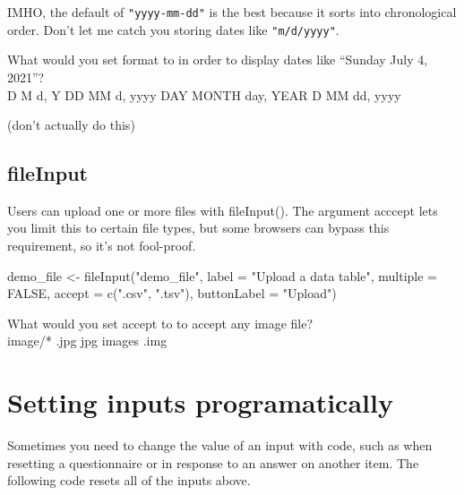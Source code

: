 \documentclass[
]{book}
\newenvironment{Shaded}{\begin{snugshade}}{\end{snugshade}}
\newcommand{\AttributeTok}[1]{\textcolor[rgb]{0.77,0.63,0.00}{#1}}
\newcommand{\ConstantTok}[1]{\textcolor[rgb]{0.00,0.00,0.00}{#1}}
\newcommand{\FunctionTok}[1]{\textcolor[rgb]{0.00,0.00,0.00}{#1}}
\newcommand{\NormalTok}[1]{#1}
\newcommand{\OtherTok}[1]{\textcolor[rgb]{0.56,0.35,0.01}{#1}}
\newcommand{\StringTok}[1]{\textcolor[rgb]{0.31,0.60,0.02}{#1}}
\begin{document}
IMHO, the default of \texttt{"yyyy-mm-dd"} is the best because it sorts into chronological order. Don't let me catch you storing dates like \texttt{"m/d/yyyy"}.

What would you set format to in order to display dates like ``Sunday July 4, 2021''?\\
D M d, Y DD MM d, yyyy DAY MONTH day, YEAR D MM dd, yyyy

(don't actually do this)

\hypertarget{fileinput}{%
\subsection{fileInput}\label{fileinput}}

Users can upload one or more files with fileInput(). The argument acccept lets you limit this to certain file types, but some browsers can bypass this requirement, so it's not fool-proof.

\begin{Shaded}
\begin{Highlighting}[]
\NormalTok{demo\_file }\OtherTok{\textless{}{-}} \FunctionTok{fileInput}\NormalTok{(}\StringTok{"demo\_file"}\NormalTok{,}
                       \AttributeTok{label =} \StringTok{"Upload a data table"}\NormalTok{,}
                       \AttributeTok{multiple =} \ConstantTok{FALSE}\NormalTok{,}
                       \AttributeTok{accept =} \FunctionTok{c}\NormalTok{(}\StringTok{".csv"}\NormalTok{, }\StringTok{".tsv"}\NormalTok{),}
                       \AttributeTok{buttonLabel =} \StringTok{"Upload"}\NormalTok{)}
\end{Highlighting}
\end{Shaded}

What would you set accept to to accept any image file?\\
image/* .jpg jpg images .img

\hypertarget{setting-inputs-programatically}{%
\section{Setting inputs programatically}\label{setting-inputs-programatically}}

Sometimes you need to change the value of an input with code, such as when resetting a questionnaire or in response to an answer on another item. The following code resets all of the inputs above.
\end{document}
